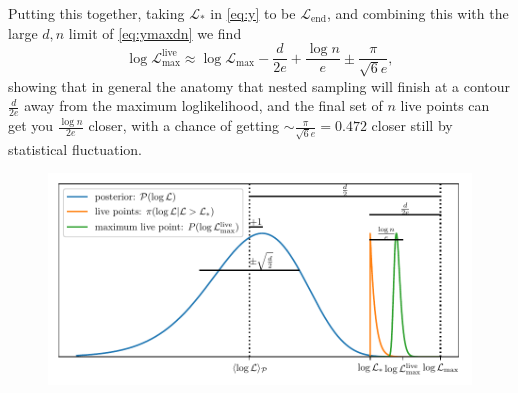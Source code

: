 \documentclass[usenatbib]{mnras}
\begin{document}
Putting this together, taking $\mathcal{L}_*$ in \cref{eq:y} to be $\mathcal{L}_\mathrm{end}$, and combining this with the large $d,n$ limit of \cref{eq:ymaxdn} we find
\begin{equation}
    \boxed{
        \log{\mathcal{L}}_\mathrm{max}^\mathrm{live} \approx \log\mathcal{L}_\mathrm{max} - \frac{d}{2e} + \frac{\log n}{e} \pm \frac{\pi}{\sqrt{6}e}
    },
\end{equation}
showing that in general the anatomy that nested sampling will finish at a contour $\frac{d}{2e}$ away from the maximum loglikelihood, and the final set of $n$ live points can get you $\frac{\log n}{2e}$ closer, with a chance of getting $\sim\frac{\pi}{\sqrt{6}e}=0.472$ closer still by statistical fluctuation.

\begin{figure}
\begin{center}
	\includegraphics{Figures/anatomy.pdf}
\end{center}
\caption{}
\label{fig:anatomy}
\end{figure}
\end{document}
